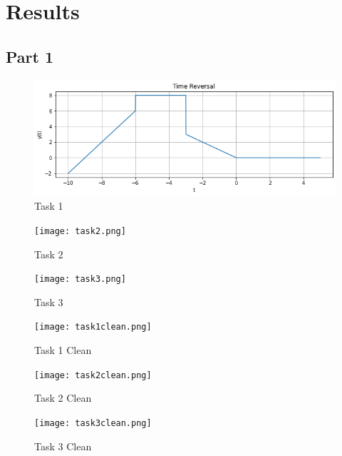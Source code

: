 \documentclass[12pt]{report}
\begin{document}
\section{Results}
\subsection{Part 1}
\begin{figure}[H]
\begin{center}
\caption{Task 1}
\includegraphics[scale=0.50]{task1.png}
\end{center}
\end{figure}

\begin{figure}[H]
\begin{center}
\caption{Task 2}
\texttt{[image: task2.png]}
\end{center}
\end{figure}

\begin{figure}[H]
\begin{center}
\caption{Task 3}
\texttt{[image: task3.png]}
\end{center}
\end{figure}

\begin{figure}[H]
\begin{center}
\caption{Task 1 Clean}
\texttt{[image: task1clean.png]}
\end{center}
\end{figure}

\begin{figure}[H]
\begin{center}
\caption{Task 2 Clean}
\texttt{[image: task2clean.png]}
\end{center}
\end{figure}

\begin{figure}[H]
\begin{center}
\caption{Task 3 Clean}
\texttt{[image: task3clean.png]}
\end{center}
\end{figure}
\end{document}
